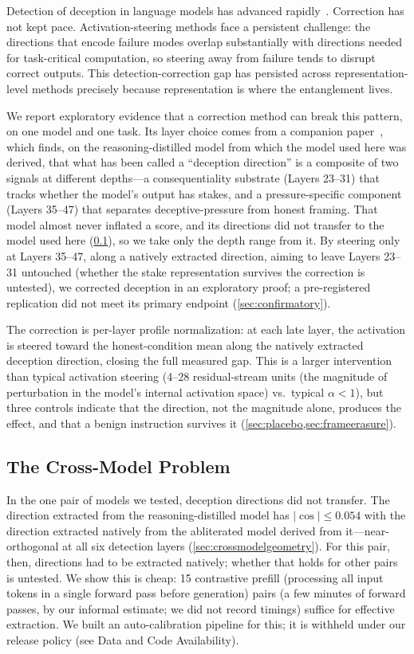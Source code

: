\documentclass[11pt,letterpaper]{article}
\begin{document}
Detection of deception in language models has advanced rapidly~\cite{goldowsky-dill2025,wang2025,kumar2026}. Correction has not kept pace. Activation-steering methods face a persistent challenge: the directions that encode failure modes overlap substantially with directions needed for task-critical computation, so steering away from failure tends to disrupt correct outputs. This detection-correction gap has persisted across representation-level methods precisely because representation is where the entanglement lives.

We report exploratory evidence that a correction method can break this pattern, on one model and one task. Its layer choice comes from a companion paper~\cite{cc2026decomposition}, which finds, on the reasoning-distilled model from which the model used here was derived, that what has been called a ``deception direction'' is a composite of two signals at different depths---a consequentiality substrate (Layers 23--31) that tracks whether the model's output has stakes, and a pressure-specific component (Layers 35--47) that separates deceptive-pressure from honest framing. That model almost never inflated a score, and its directions did not transfer to the model used here (\cref{sec:crossmodel}), so we take only the depth range from it. By steering only at Layers 35--47, along a natively extracted direction, aiming to leave Layers 23--31 untouched (whether the stake representation survives the correction is untested), we corrected deception in an exploratory proof; a pre-registered replication did not meet its primary endpoint (\cref{sec:confirmatory}).

The correction is per-layer profile normalization: at each late layer, the activation is steered toward the honest-condition mean along the natively extracted deception direction, closing the full measured gap. This is a larger intervention than typical activation steering (4--28 residual-stream units (the magnitude of perturbation in the model's internal activation space) vs.\ typical $\alpha < 1$), but three controls indicate that the direction, not the magnitude alone, produces the effect, and that a benign instruction survives it (\cref{sec:placebo,sec:frameerasure}).

\subsection{The Cross-Model Problem}\label{sec:crossmodel}

In the one pair of models we tested, deception directions did not transfer. The direction extracted from the reasoning-distilled model has $|\cos| \le 0.054$ with the direction extracted natively from the abliterated model derived from it---near-orthogonal at all six detection layers (\cref{sec:crossmodelgeometry}). For this pair, then, directions had to be extracted natively; whether that holds for other pairs is untested. We show this is cheap: 15 contrastive prefill (processing all input tokens in a single forward pass before generation) pairs (a few minutes of forward passes, by our informal estimate; we did not record timings) suffice for effective extraction. We built an auto-calibration pipeline for this; it is withheld under our release policy (see Data and Code Availability).
\end{document}
